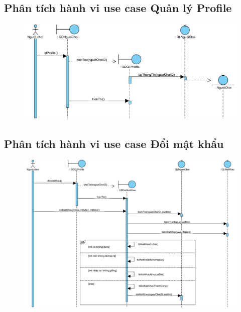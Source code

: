 \documentclass[3p]{elsarticle}
\begin{document}
\subsection{Phân tích hành vi use case Quản lý Profile}
\begin{figure}[!htbp]
	\hspace*{-.5in}
	\centering
	\includegraphics[scale=.55]{images/sequence-pdfs/gamer/ProfileManagement.pdf}
\end{figure}
\newpage

\subsection{Phân tích hành vi use case Đổi mật khẩu}
\begin{figure}[!htbp]
	\hspace*{-.5in}
	\centering
	\includegraphics[scale=.55]{images/sequence-pdfs/gamer/ProfileManagement_ChangePassword.pdf}
\end{figure}
\newpage
\end{document}
